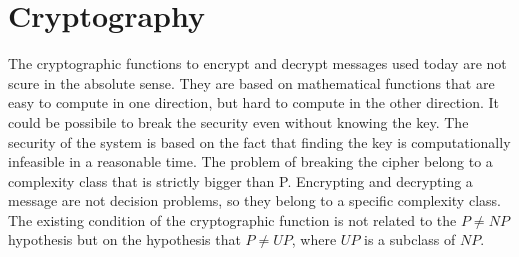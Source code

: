 \section{Cryptography}
The cryptographic functions to encrypt and decrypt messages used today are not scure in the absolute sense. They are based on mathematical functions that are easy to compute in one direction, but hard to compute in the other direction. It could be possibile to break the security even without knowing the key. The security of the system is based on the fact that finding the key is computationally infeasible in a reasonable time. The problem of breaking the cipher belong to a complexity class that is strictly bigger than P. Encrypting and decrypting a message are not decision problems, so they belong to a specific complexity class. The existing condition of the cryptographic function is not related to the $P\not= NP$ hypothesis but on the hypothesis that $P\not= UP$, where $UP$ is a subclass of $NP$.
